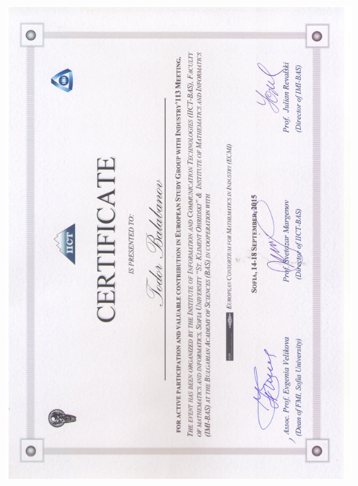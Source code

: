 \documentclass[english,a4paper]{europasscv}
\begin{document}
\includegraphics[width=\textwidth,height=\textheight,keepaspectratio]{ESGI1132015}
\end{document}

